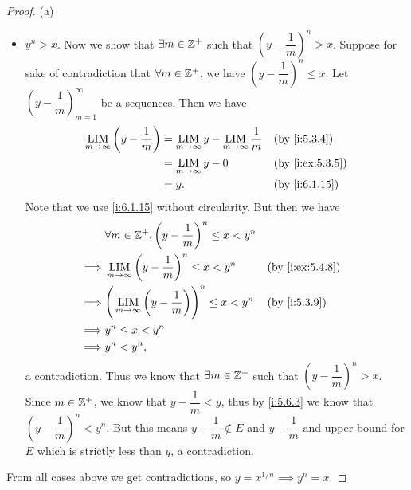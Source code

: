 \begin{proof}{(a)}
\begin{itemize}
    \item \(y^n > x\).
          Now we show that \(\exists m \in \mathbb{Z}^+\) such that \((y - \dfrac{1}{m})^n > x\).
          Suppose for sake of contradiction that \(\forall m \in \mathbb{Z}^+\), we have \((y - \dfrac{1}{m})^n \leq x\).
          Let \((y - \dfrac{1}{m})_{m = 1}^\infty\) be a sequences.
          Then we have
          \begin{align*}
            \LIM_{m \to \infty} \bigg(y - \dfrac{1}{m}\bigg) & = \LIM_{m \to \infty} y - \LIM_{m \to \infty} \dfrac{1}{m} &  & \by{i:5.3.4}    \\
                                                             & = \LIM_{m \to \infty} y - 0                                &  & \by{i:ex:5.3.5} \\
                                                             & = y.                                                       &  & \by{i:6.1.15}
          \end{align*}
          Note that we use \cref{i:6.1.15} without circularity.
          But then we have
          \begin{align*}
                     & \forall m \in \Z^+, \bigg(y - \dfrac{1}{m}\bigg)^n \leq x < y^n                                  \\
            \implies & \LIM_{m \to \infty} \bigg(y - \dfrac{1}{m}\bigg)^n \leq x < y^n             &  & \by{i:ex:5.4.8} \\
            \implies & \Bigg(\LIM_{m \to \infty} \bigg(y - \dfrac{1}{m}\bigg)\Bigg)^n \leq x < y^n &  & \by{i:5.3.9}    \\
            \implies & y^n \leq x < y^n                                                                                 \\
            \implies & y^n < y^n,
          \end{align*}
          a contradiction.
          Thus we know that \(\exists m \in \mathbb{Z}^+\) such that \((y - \dfrac{1}{m})^n > x\).
          Since \(m \in \mathbb{Z}^+\), we know that \(y - \dfrac{1}{m} < y\), thus by \cref{i:5.6.3} we know that \((y - \dfrac{1}{m})^n < y^n\).
          But this means \(y - \dfrac{1}{m} \notin E\) and \(y - \dfrac{1}{m}\) and upper bound for \(E\) which is strictly less than \(y\), a contradiction.
  \end{itemize}
  From all cases above we get contradictions, so \(y = x^{1 / n} \implies y^n = x\).
\end{proof}

